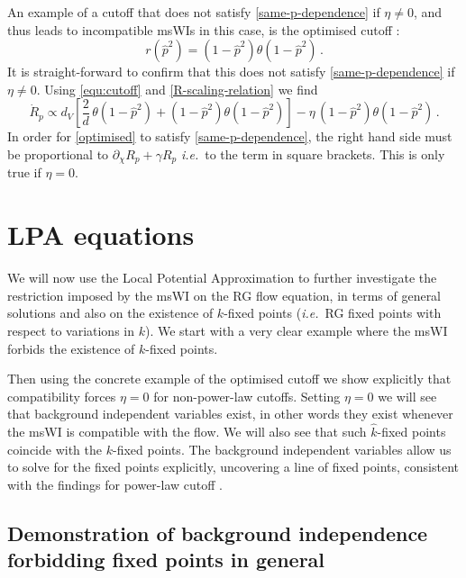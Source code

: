 \documentclass[11pt,a4paper]{article}
\numberwithin{figure}{section}
\numberwithin{equation}{section}
\newcommand\ie{\textit{i.e.}\ }
\newcommand{\be}{\begin{equation}}
\newcommand{\ee}{\end{equation}}
\begin{document}
An example of a cutoff that does not satisfy \eqref{same-p-dependence} if $\eta\ne0$, and thus leads to incompatible msWIs in this case, is the optimised cutoff \cite{opt1,opt3}:
\be 
\label{optimised}
r(\hat{p}^2) = (1-\hat{p}^2)\theta(1-\hat{p}^2)\,.
\ee
It is straight-forward to confirm that this does not satisfy \eqref{same-p-dependence} if $\eta\ne0$. Using \eqref{equ:cutoff} and \eqref{R-scaling-relation} we find
\be 
\dot{R}_p \propto d_V \left[ \frac{2}{d}\,\theta(1-\hat{p}^2) + (1-\hat{p}^2)\theta(1-\hat{p}^2)\right] - \eta\, (1-\hat{p}^2)\theta(1-\hat{p}^2)\,.
\ee
In order for \eqref{optimised} to satisfy \eqref{same-p-dependence}, the right hand side must be proportional to $\partial_\chi R_p+\gamma R_p$ \ie to the term in square brackets. This is only true if $\eta=0$.


\section{LPA equations}

We will now use the Local Potential Approximation to further investigate the restriction imposed by the msWI on the RG flow equation, in terms of general solutions and also on the existence of $k$-fixed points (\ie RG fixed points with respect to variations in $k$). We start with a very clear example where the msWI forbids the existence of $k$-fixed points. 

Then using the concrete example of the optimised cutoff we show explicitly that compatibility forces $\eta=0$ for non-power-law cutoffs. Setting $\eta=0$ we will see that background independent variables exist, in other words they exist whenever the msWI is compatible with the flow. We will also see that such $\hat{k}$-fixed points coincide with the $k$-fixed points. The background independent variables allow us to solve for the fixed points explicitly, uncovering a line of fixed points, consistent with the findings for power-law cutoff \cite{Dietz2016}.

\subsection{Demonstration of background independence forbidding fixed points in general}\label{sec:forbids}
\end{document}
